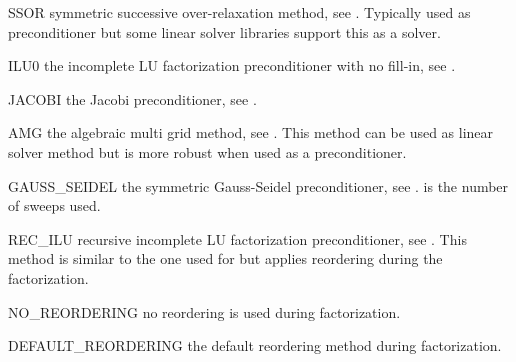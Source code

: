 \begin{memberdesc}[SolverOptions]{SSOR}
symmetric successive over-relaxation method, see .
Typically used as preconditioner but some linear solver libraries support
this as a solver.
\end{memberdesc}

\begin{memberdesc}[SolverOptions]{ILU0}
the incomplete LU factorization preconditioner with no fill-in, see .
\end{memberdesc}

\begin{memberdesc}[SolverOptions]{JACOBI}
the Jacobi preconditioner, see .
\end{memberdesc}

\begin{memberdesc}[SolverOptions]{AMG}
the algebraic multi grid method, see . This method can be used as
linear solver method but is more robust when used as a preconditioner.
\end{memberdesc}

\begin{memberdesc}[SolverOptions]{GAUSS_SEIDEL}
the symmetric Gauss-Seidel preconditioner, see .
 is the number of sweeps used.
\end{memberdesc}


\begin{memberdesc}[SolverOptions]{REC_ILU}
recursive incomplete LU factorization preconditioner, see .
This method is similar to the one used for \ILU but applies reordering during
the factorization.
\end{memberdesc}

\begin{memberdesc}[SolverOptions]{NO_REORDERING}
no reordering is used during factorization.
\end{memberdesc}

\begin{memberdesc}[SolverOptions]{DEFAULT_REORDERING}
the default reordering method during factorization.
\end{memberdesc}

